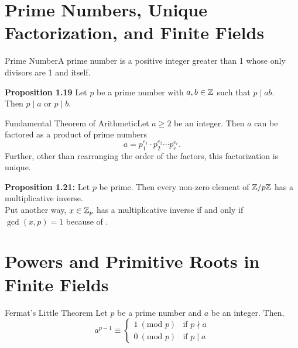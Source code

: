 \renewcommand{\theenumi}{\arabic{enumi}}
\renewcommand{\labelenumi}{\theenumi.}
\section{Prime Numbers, Unique Factorization, and Finite Fields}

\begin{definition}
    {Prime Number}A prime number is a positive integer greater than 1 whose only divisors are 1 and itself.
\end{definition}

\textbf{Proposition 1.19} Let \(p\) be a prime number with \(a,b \in \mathbb{Z}\) such that \(p \mid ab\). \\
Then \(p \mid a\) or \(p \mid b\). \\

\begin{theorem}
    {Fundamental Theorem of Arithmetic}Let \(a \geq 2\) be an integer. Then \(a\) can be factored as a product of prime numbers \[a = p_1^{e_1} \cdot p_2^{e_2} \cdots p_r^{e_r}.\] Further, other than rearranging the order of the factors, this factorization is unique.
\end{theorem}

\textbf{Proposition 1.21:} Let \(p\) be prime. Then every non-zero element of \(\mathbb{Z}/p\mathbb{Z}\) has a multiplicative inverse. \\

Put another way, \(x \in \mathbb{Z}_p\) has a multiplicative inverse if and only if \(\gcd(x,p) = 1\) because of . \\


\pfs%

\renewcommand{\theenumi}{\arabic{enumi}}
\renewcommand{\labelenumi}{\theenumi.}
\section{Powers and Primitive Roots in Finite Fields}
\label{thm:Fermat's Little Theorem}

\begin{theorem}
    {Fermat's Little Theorem} Let \(p\) be a prime number and \(a\) be an integer. Then, \[a^{p - 1} \equiv \begin{cases}
            1 \ (\text{mod } p) & \text{if } p \nmid a \\
            0 \ (\text{mod } p) & \text{if } p \mid a
        \end{cases}\]
\end{theorem}

